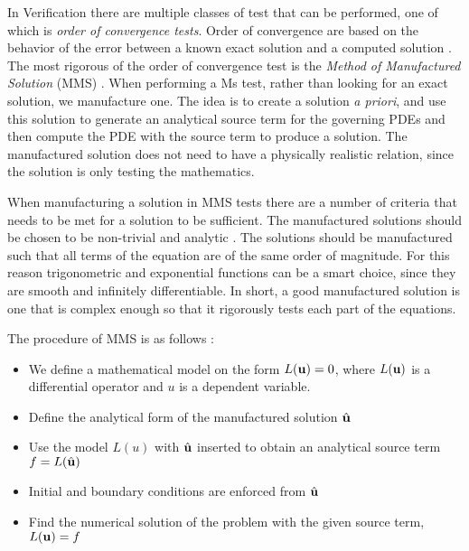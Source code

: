 In Verification there are multiple classes of test that can be performed, one of which is \textit{order of convergence tests}. Order of convergence are based on the behavior of the error between a known exact solution and a computed solution \cite{Roache2002}. The most rigorous of the order of convergence test is the \textit{Method of Manufactured Solution} (MMS) \cite{Oberkampf2010}. When performing a Ms test, rather than looking for an exact solution, we manufacture one. The idea is to create a solution \textit{a priori}, and use this solution to generate an analytical source term for the governing PDEs and then compute the PDE with the source term to produce a solution. The manufactured solution does not need to have a physically realistic relation, since the solution is only testing the mathematics. \newline

When manufacturing a solution in MMS tests there are a number of criteria that needs to be met for a solution to be sufficient. The manufactured solutions should be chosen to be non-trivial and analytic \cite{Oberkampf2010, Roache2002}. The solutions should be manufactured such that all terms of the equation are of the same order of magnitude. For this reason trigonometric and exponential functions can be a smart choice, since they are smooth and infinitely differentiable. In short, a good manufactured solution is one that is complex enough so that it rigorously tests each part of the equations.\newline 

The procedure of MMS is as follows \cite{Oberkampf2010}:
\begin{itemize}
\item We define a mathematical model on the form $ L(\bold{u}) = 0$, where $L(\bold{u})$ is a differential operator and $u$ is a dependent variable.
\item Define the analytical form of the manufactured solution $\hat{\bold{u}}$
\item Use the model $L(u)$ with $\hat{\bold{u}}$ inserted to obtain an analytical source term $ f = L(\hat{\bold{u}}) $
\item Initial and boundary conditions are enforced from $\hat{\bold{u}}$
\item Find the numerical solution of the problem with the given source term, $L(\bold{u}) = f $
\end{itemize}

